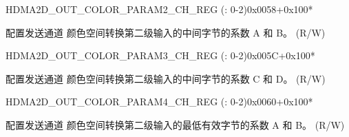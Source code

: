 \begin{register}{H}{DMA2D\_OUT\_COLOR\_PARAM2\_CH\_REG (: 0-2)}{0x0058+0x100*}\label{regdesc:DMA2DOUTCOLORPARAM2CHNREG}
%
%
\regnewline%
\begin{regdesc}\begin{reglist}
\label{fielddesc:DMA2DOUTCOLORPARAMM0CHN}\item [DMA2D\_OUT\_COLOR\_PARAM\_M0\_CH\regindex{n}] 配置发送通道  颜色空间转换第二级输入的中间字节的系数 A 和 B。 (R/W)
\end{reglist}\end{regdesc}
\end{register}


\begin{register}{H}{DMA2D\_OUT\_COLOR\_PARAM3\_CH\_REG (: 0-2)}{0x005C+0x100*}\label{regdesc:DMA2DOUTCOLORPARAM3CHNREG}
%
%
\regnewline%
\begin{regdesc}\begin{reglist}
\label{fielddesc:DMA2DOUTCOLORPARAMM1CHN}\item [DMA2D\_OUT\_COLOR\_PARAM\_M1\_CH\regindex{n}] 配置发送通道  颜色空间转换第二级输入的中间字节的系数 C 和 D。 (R/W)
\end{reglist}\end{regdesc}
\end{register}


\begin{register}{H}{DMA2D\_OUT\_COLOR\_PARAM4\_CH\_REG (: 0-2)}{0x0060+0x100*}\label{regdesc:DMA2DOUTCOLORPARAM4CHNREG}
%
%
\regnewline%
\begin{regdesc}\begin{reglist}
\label{fielddesc:DMA2DOUTCOLORPARAML0CHN}\item [DMA2D\_OUT\_COLOR\_PARAM\_L0\_CH\regindex{n}] 配置发送通道  颜色空间转换第二级输入的最低有效字节的系数 A 和 B。 (R/W)
\end{reglist}\end{regdesc}
\end{register}



